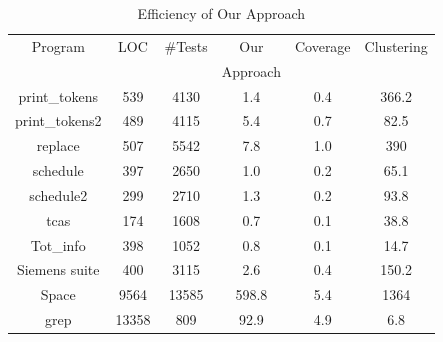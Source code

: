 \documentclass{sig-alternate}
\begin{document}
\begin{table}[t]
\caption{Efficiency of Our Approach}\label{tab:effi} \center
\begin{tabular}{|c|c|c|c|c|c|}
\hline Program   & LOC & \#Tests & Our  & \hspace{-0.1cm}Coverage\hspace{-0.1cm} & \hspace{-0.1cm}Clustering\hspace{-0.1cm}   \\
& & & \hspace{-0.1cm}Approach\hspace{-0.1cm} &  &  \\

\hline  print\_tokens   &   539 &   4130    &   1.4 &   0.4 &   366.2   \\
\hline  print\_tokens2  &   489 &   4115    &   5.4 &   0.7 &   82.5    \\
\hline  replace &   507 &   5542    &   7.8 &   1.0 &   390 \\
\hline  schedule    &   397 &   2650    &   1.0 &   0.2 &   65.1    \\
\hline  schedule2   &   299 &   2710    &   1.3 &   0.2 &   93.8    \\
\hline  tcas    &   174 &   1608    &   0.7 &   0.1 &   38.8    \\
\hline  Tot\_info   &   398 &   1052    &   0.8 &   0.1 &   14.7    \\
\hline  Siemens suite   &   400 &   3115    &   2.6 &   0.4 &   150.2   \\
\hline  Space   &   9564    &   13585   &   598.8   &   5.4 &   1364    \\
\hline  grep    &   13358   &   809 &   92.9    &   4.9 &   6.8 \\


\hline
\end{tabular} \vspace{-0.2in}
\end{table}
\end{document}
